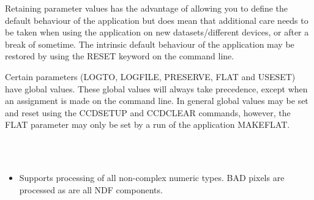 \documentclass[twoside,11pt]{article}
\newcommand{\htmlref}[2]{#1}
\renewcommand{\_}{\texttt{\symbol{95}}}
\newcommand{\xroutine}[1]{\htmlref{{\sc #1}}{#1}}
\newcommand{\sstimplementationstatus}[1]{
   \item[{Implementation Status:}] \mbox{} \\[1.3ex] #1}
\newcommand{\sstitemlist}[1]{
  \mbox{} \\
  \vspace{-3.5ex}
  \begin{itemize}
     #1
  \end{itemize}
}
\newcommand{\sstitem}{\item}
\newcommand{\sstimplementationstatus}[1]{
      \item[Implementation Status:] #1
   }
\newcommand{\sstitemlist}[1]{
      \begin{itemize}
         #1
      \end{itemize}
      \\
   }
\newcommand{\sstitem}{\item}
\begin{document}
{{{      }
      Retaining parameter values has the advantage of allowing you to
      define the default behaviour of the application but does mean
      that additional care needs to be taken when using the application
      on new datasets/different devices, or after a break of sometime.
      The intrinsic default behaviour of the application may be
      restored by using the RESET keyword on the command line.

      Certain parameters (LOGTO, LOGFILE, PRESERVE, FLAT and USESET) have
      global values. These global values will always take precedence,
      except when an assignment is made on the command line.  In general
      global values may be set and reset using the \xroutine{CCDSETUP} and
      \xroutine{CCDCLEAR} commands, however, the FLAT parameter may only be set by
      a run of the application \xroutine{MAKEFLAT}.
   }
   \sstimplementationstatus{
      \sstitemlist{

         \sstitem
         Supports processing of all non-complex numeric types.
           BAD pixels are processed as are all NDF components.
      }
   }
}
\end{document}
